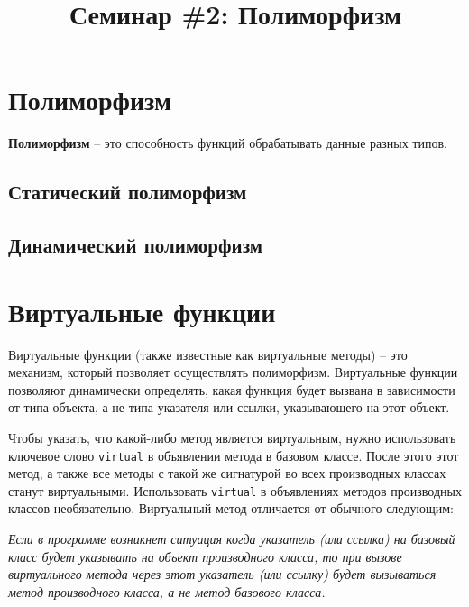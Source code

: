 \documentclass{article}
\begin{document}
\title{Семинар \#2: Полиморфизм \vspace{-5ex}}\date{}\maketitle

\section*{Полиморфизм}
\textbf{Полиморфизм} -- это способность функций обрабатывать данные разных типов.
\subsection*{Статический полиморфизм}
\subsection*{Динамический полиморфизм}


\section*{Виртуальные функции}
Виртуальные функции (также известные как виртуальные методы) -- это механизм, который позволяет осуществлять полиморфизм.
Виртуальные функции позволяют динамически определять, какая функция будет вызвана в зависимости от типа объекта, а не типа указателя или ссылки, указывающего на этот объект.

Чтобы указать, что какой-либо метод является виртуальным, нужно использовать ключевое слово \texttt{virtual} в объявлении метода в базовом классе. После этого этот метод, а также все методы с такой же сигнатурой во всех производных классах станут виртуальными. Использовать \texttt{virtual} в объявлениях методов производных классов необязательно. Виртуальный метод отличается от обычного следующим:

\begin{center}
\textit{Если в программе возникнет ситуация когда указатель (или ссылка) на базовый класс будет указывать на объект производного класса, то при вызове виртуального метода через этот указатель (или ссылку) будет вызываться метод производного класса, а не метод базового класса.}
\end{center}
\end{document}
